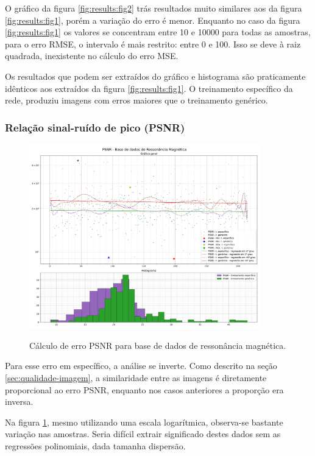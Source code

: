 O gráfico da figura \ref{fig:results:fig2} trás resultados muito similares aos da figura \ref{fig:results:fig1}, porém a variação do erro é menor. Enquanto no caso da figura \ref{fig:results:fig1} os valores se concentram entre 10 e 10000 para todas as amostras, para o erro RMSE, o intervalo é mais restrito: entre 0 e 100. Isso se deve à raiz quadrada, inexistente no cálculo do erro MSE.

Os resultados que podem ser extraídos do gráfico e histograma são praticamente idênticos aos extraídos da figura \ref{fig:results:fig1}. O treinamento específico da rede, produziu imagens com erros maiores que o treinamento genérico. 

\subsubsection{Relação sinal-ruído de pico (PSNR)}
\label{sec:result:mri:psnr}

\begin{figure}[H]
    \centering
    \caption{Cálculo de erro PSNR para base de dados de ressonância magnética.}
    \includegraphics[width=10cm]{fig/resultados/mri/png/psnr_mri_compound.png}
    \label{fig:results:fig3}
\end{figure}

Para esse erro em específico, a análise se inverte. Como descrito na seção \ref{sec:qualidade-imagem}, a similaridade entre as imagens é diretamente proporcional ao erro PSNR, enquanto nos casos anteriores a proporção era inversa.

Na figura \ref{fig:results:fig3}, mesmo utilizando uma escala logarítmica, observa-se bastante variação nas amostras. Seria difícil extrair significado destes dados sem as regressões polinomiais, dada tamanha dispersão. 

